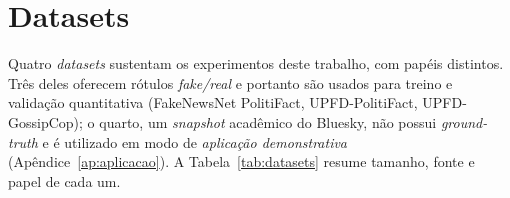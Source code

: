 \section{Datasets}
\label{sec:datasets}

Quatro \emph{datasets} sustentam os experimentos deste trabalho, com
pap\'eis distintos. Tr\^es deles oferecem r\'otulos
\emph{fake/real} e portanto s\~ao usados para treino e valida\c{c}\~ao
quantitativa (FakeNewsNet PolitiFact, UPFD-PolitiFact, UPFD-GossipCop);
o quarto, um \emph{snapshot} acad\^emico do Bluesky, n\~ao possui
\emph{ground-truth} e \'e utilizado em modo de \emph{aplica\c{c}\~ao
demonstrativa} (Ap\^endice~\ref{ap:aplicacao}). A
Tabela~\ref{tab:datasets} resume tamanho, fonte e papel de cada um.

\begin{table}[H]\centering
\caption{Datasets utilizados, com tamanho, fonte e papel no trabalho.}
\label{tab:datasets}
\end{table}


